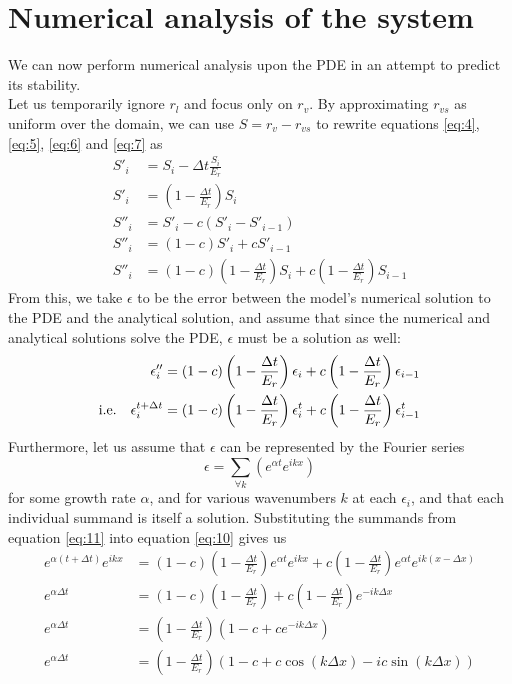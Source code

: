 \documentclass[11pt]{article}
\begin{document}
\section{Numerical analysis of the system}
We can now perform numerical analysis upon the PDE in an attempt to predict its stability. \\
Let us temporarily ignore $r_l$ and focus only on $r_v$. By approximating $r_{vs}$ as uniform over the domain, we can use $S=r_v-r_{vs}$ to rewrite equations \ref{eq:4}, \ref{eq:5}, \ref{eq:6} and \ref{eq:7} as
\begin{align}
S'_i &= S_i - \Delta t\frac{S_i}{E_r}		\nonumber \\
S'_i &= \left(1-\frac{\Delta t}{E_r}\right)S_i	\nonumber \\
S''_i &= S'_i - c\left(S'_i - S'_{i-1}\right)		\nonumber \\
S''_i &= \left(1-c\right)S'_i + cS'_{i-1}		\nonumber \\
S''_i &= \left(1-c\right)\left(1-\frac{\Delta t}{E_r}\right)S_i + c\left(1-\frac{\Delta t}{E_r}\right)S_{i-1}	\label{eq:9}
\end{align}
From this, we take $\epsilon$ to be the error between the model's numerical solution to the PDE and the analytical solution, and assume that since the numerical and analytical solutions solve the PDE, $\epsilon$ must be a solution as well:
\begin{align} \nonumber
\epsilon''_i &= \left(1-c\right)\left(1-\frac{\Delta t}{E_r}\right)\epsilon_i + c\left(1-\frac{\Delta t}{E_r}\right)\epsilon_{i-1} \\
\label{eq:10} \text{i.e.\quad}
\epsilon^{t+\Delta t}_i &= \left(1-c\right)\left(1-\frac{\Delta t}{E_r}\right)\epsilon^t_i
+ c\left(1-\frac{\Delta t}{E_r}\right)\epsilon^t_{i-1}
\end{align}
Furthermore, let us assume that $\epsilon$ can be represented by the Fourier series
\begin{equation} \label{eq:11}
\epsilon = \sum_{\forall k}\left(e^{\alpha t}e^{ikx}\right)
\end{equation}
for some growth rate $\alpha$, and for various wavenumbers $k$ at each $\epsilon_i$, and that each individual summand is itself a solution. Substituting the summands from equation \ref{eq:11} into equation \ref{eq:10} gives us
\begin{align*}
e^{\alpha\left(t+\Delta t\right)}e^{ikx}
&= \left(1-c\right)\left(1-\frac{\Delta t}{E_r}\right)e^{\alpha t}e^{ikx}
+ c\left(1-\frac{\Delta t}{E_r}\right)e^{\alpha t}e^{ik\left(x-\Delta x\right)} \\
e^{\alpha\Delta t}
&= \left(1-c\right)\left(1-\frac{\Delta t}{E_r}\right)
+ c\left(1-\frac{\Delta t}{E_r}\right)e^{-ik\Delta x} \\
e^{\alpha\Delta t}
&= \left(1-\frac{\Delta t}{E_r}\right)\left(1-c+ce^{-ik\Delta x}\right) \\
e^{\alpha\Delta t}
&= \left(1-\frac{\Delta t}{E_r}\right)\left(1-c+c\cos\left(k\Delta x\right)-ic\sin\left(k\Delta x\right)\right)
\end{align*}
\end{document}

